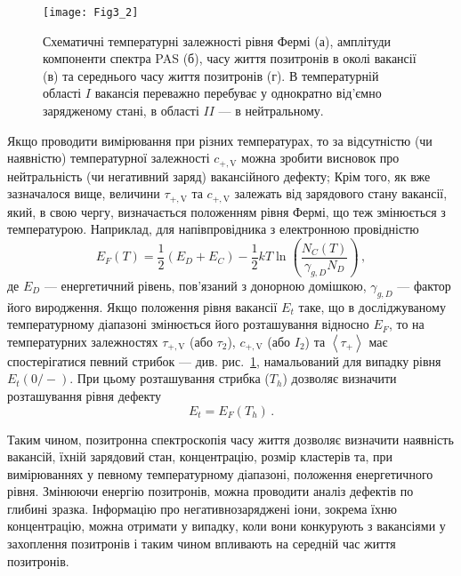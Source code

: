 \begin{figure}[!b]
\center
\vspace{-5mm}
\texttt{[image: Fig3\_2]}
\vspace{-3mm}
\caption{Схематичні температурні
залежності рівня Фермі (а),
амплітуди компоненти спектра PAS (б),
часу життя позитронів в околі вакансії (в)
та середнього часу життя позитронів (г).
В температурній області $I$ вакансія переважно
перебуває у однократно від'ємно зарядженому стані,
в області $II$ --- в нейтральному.
}
\vspace{-3mm}
\label{F32}
\end{figure}

Якщо проводити вимірювання при різних температурах, то
за відсутністю (чи наявністю) температурної залежності $c_{+,\mathrm{V}}$ можна зробити
висновок про нейтральність (чи негативний заряд) вакансійного дефекту;
Крім того, як вже зазначалося вище, величини $\tau_{+,\mathrm{V}}$ та $c_{+,\mathrm{V}}$ залежать від зарядового стану
вакансії, який, в свою чергу, визначається положенням рівня Фермі, що теж змінюється з температурою.
Наприклад, для напівпровідника з електронною провідністю
\begin{equation}\label{EF}
E_F(T)=\frac{1}{2}(E_D+E_C)-\frac{1}{2}kT\ln\left(\frac{N_C(T)}{\gamma_{g,D}N_D}\right)\,,
\end{equation}
де
$E_D$ --- енергетичний рівень, пов'язаний з донорною домішкою,
$\gamma_{g,D}$ --- фактор його виродження.
Якщо положення рівня вакансії $E_{t}$ таке, що
в досліджуваному температурному діапазоні змінюється його розташування
відносно $E_F$, то на температурних залежностях $\tau_{+,\mathrm{V}}$ (або $\tau_2$),
$c_{+,\mathrm{V}}$ (або $I_2$) та $\left\langle\tau_+\right\rangle$
має спостерігатися певний стрибок --- див. рис.~\ref{F32}, намальований для випадку рівня  $E_t(0/-)$.
При цьому розташування стрибка ($T_{h}$) дозволяє визначити розташування рівня дефекту
\begin{equation}
E_t =E_F(T_{h})\,.
\end{equation}

Таким чином, позитронна спектроскопія часу життя дозволяє визначити наявність вакансій,
їхній зарядовий стан, концентрацію, розмір кластерів та, при вимірюваннях у певному температурному діапазоні,
положення енергетичного рівня.
Змінюючи енергію позитронів, можна проводити аналіз дефектів по глибині зразка.
Інформацію про негативнозаряджені іони, зокрема їхню концентрацію,
можна отримати у випадку, коли вони конкурують з вакансіями у захоплення позитронів і таким чином впливають на середній час життя позитронів.

